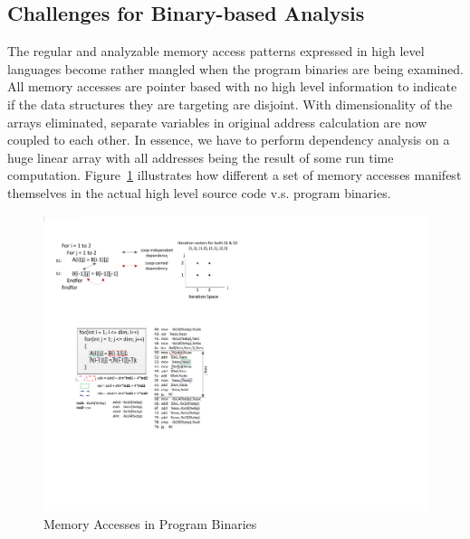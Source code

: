 \subsection{Challenges for Binary-based Analysis}
\label{sec:cfbba}
The regular and analyzable memory access patterns expressed in high
level languages become rather mangled when the program binaries are 
being examined. All memory accesses are pointer based with no high
level information to indicate if the data structures they are targeting
are disjoint. With dimensionality of the arrays eliminated, 
separate variables in original address calculation are now coupled to each other. In essence, we have to perform dependency analysis on a huge linear
array with all addresses being the result of some run time computation.
Figure~\ref{fig:mangledMem} illustrates how different a
set of memory accesses manifest themselves in the actual high level source code v.s. program binaries.

\begin{figure}[htp]
\begin{center}
\includegraphics[width=0.8\linewidth]{chap6fig/memBin.pdf}
\caption{Memory Accesses in Program Binaries
\label{fig:mangledMem}}
\end{center}
\end{figure}

